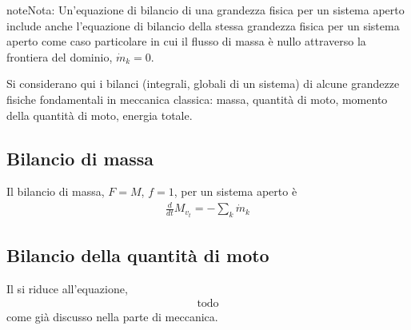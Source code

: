 \documentclass[letterpaper,10pt,italian]{jupyterBook}
\begin{document}
\begin{sphinxadmonition}{note}{Nota:}
\sphinxAtStartPar
Un’equazione di bilancio di una grandezza fisica per un sistema aperto include anche l’equazione di bilancio della stessa grandezza fisica per un sistema aperto come caso particolare in cui il flusso di massa è nullo attraverso la frontiera del dominio, \(\dot{m}_k = 0\).
\end{sphinxadmonition}

\sphinxAtStartPar
Si considerano qui i bilanci (integrali, globali di un sistema) di alcune grandezze fisiche fondamentali in meccanica classica: massa, quantità di moto, momento della quantità di moto, energia totale.


\subsection{Bilancio di massa}
\label{\detokenize{ch/thermodynamics/principles-open:bilancio-di-massa}}\label{\detokenize{ch/thermodynamics/principles-open:physics-hs-thermodynamics-foundation-principles-open-mass}}
\sphinxAtStartPar
Il bilancio di massa, \(F = M\), \(f = 1\), per un sistema aperto è
\begin{equation*}
\begin{split}\frac{d}{dt} M_{v_t} = - \sum_k \dot{m}_k\end{split}
\end{equation*}

\subsection{Bilancio della quantità di moto}
\label{\detokenize{ch/thermodynamics/principles-open:bilancio-della-quantita-di-moto}}\label{\detokenize{ch/thermodynamics/principles-open:physics-hs-thermodynamics-foundation-principles-open-momentum}}
\sphinxAtStartPar
Il {\hyperref[\detokenize{ch/mechanics/dynamics-eom-open:physics-hs-mechanics-dynamics-eom-open-momentum}]{}} si riduce all’equazione,
\begin{equation*}
\begin{split}\text{todo}\end{split}
\end{equation*}
\sphinxAtStartPar
come già discusso nella parte di meccanica.
\end{document}
